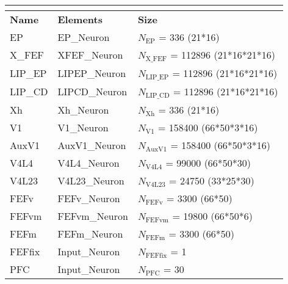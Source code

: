 \documentclass{article}
\newcommand{\hdr}[3]{
    \multicolumn{#1}{|l|}{
        \color{white}\cellcolor[gray]{0.0}
        \textbf{\makebox[0pt]{#2}\hspace{0.5\linewidth}\makebox[0pt][c]{#3}}
    }
}
\begin{document}
\noindent
\begin{tabularx}{\linewidth}{|l|l|X|}\hline
\hdr{3}{B}{Populations}\\ \hline
    \textbf{Name}   & \textbf{Elements} & \textbf{Size} \\ \hline

    EP             & EP\_Neuron        & $N_{\text{EP}}$ = 336 (21*16)  \\ \hline

    X\_FEF             & XFEF\_Neuron        & $N_{\text{X\_FEF}}$ = 112896 (21*16*21*16)  \\ \hline

    LIP\_EP             & LIPEP\_Neuron        & $N_{\text{LIP\_EP}}$ = 112896 (21*16*21*16)  \\ \hline

    LIP\_CD             & LIPCD\_Neuron        & $N_{\text{LIP\_CD}}$ = 112896 (21*16*21*16)  \\ \hline

    Xh             & Xh\_Neuron        & $N_{\text{Xh}}$ = 336 (21*16)  \\ \hline

    V1             & V1\_Neuron        & $N_{\text{V1}}$ = 158400 (66*50*3*16)  \\ \hline

    AuxV1             & AuxV1\_Neuron        & $N_{\text{AuxV1}}$ = 158400 (66*50*3*16)  \\ \hline

    V4L4             & V4L4\_Neuron        & $N_{\text{V4L4}}$ = 99000 (66*50*30)  \\ \hline

    V4L23             & V4L23\_Neuron        & $N_{\text{V4L23}}$ = 24750 (33*25*30)  \\ \hline

    FEFv             & FEFv\_Neuron        & $N_{\text{FEFv}}$ = 3300 (66*50)  \\ \hline

    FEFvm             & FEFvm\_Neuron        & $N_{\text{FEFvm}}$ = 19800 (66*50*6)  \\ \hline

    FEFm             & FEFm\_Neuron        & $N_{\text{FEFm}}$ = 3300 (66*50)  \\ \hline

    FEFfix             & Input\_Neuron        & $N_{\text{FEFfix}}$ = 1  \\ \hline

    PFC             & Input\_Neuron        & $N_{\text{PFC}}$ = 30  \\ \hline


\end{tabularx}
\end{document}
